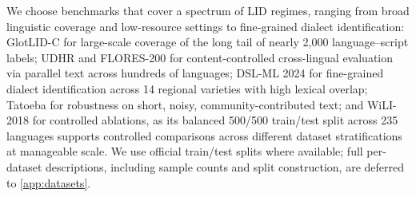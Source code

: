 \documentclass{article}
\newcommand{\note}[4][]{\todo[author=#2,color=#3,size=\scriptsize,fancyline,caption={},#1]{#4}} %
\newcommand{\clara}[2][]{\note[#1]{\textbf{Clara}}{orange!30}{#2}}
\begin{document}
We choose benchmarks that cover a spectrum of LID regimes, ranging from broad linguistic coverage and low-resource settings to fine-grained dialect identification: GlotLID-C \citep{kargaran-etal-2023-glotlid} for large-scale coverage of
the long tail of nearly 2{,}000 language--script labels;
UDHR \citep{Vatanen10LREC} and FLORES-200 \citep{nllb2022}
for content-controlled cross-lingual evaluation via parallel text across
hundreds of languages;
DSL-ML 2024 \citep{chifu-etal-2024-vardial} for fine-grained dialect
identification across 14 regional varieties with high lexical overlap;
Tatoeba \citep{tiedemann-2020-tatoeba} for robustness on short, noisy,
community-contributed text;
and WiLI-2018 \citep{Thoma2018TheWB} for controlled ablations, as its
balanced 500/500 train/test split across 235 languages supports
controlled comparisons across different dataset stratifications  at
manageable scale. We use official train/test splits where available; full
per-dataset descriptions, including sample counts and split construction,
are deferred to \cref{app:datasets}.
\end{document}

